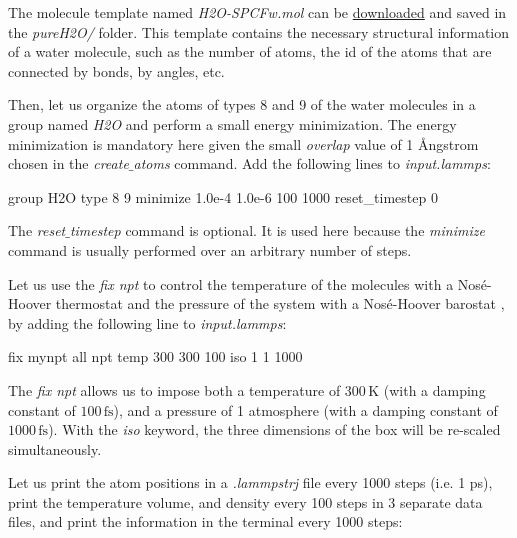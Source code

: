 \vspace{0.25cm} \noindent The molecule template named \textit{H2O-SPCFw.mol}
can be \href{https://lammpstutorials.github.io/lammpstutorials-inputs/level2/polymer-in-water/pureH2O/H2O-SPCFw.mol}{downloaded}
and saved in the \textit{pureH2O/} folder.
This template contains the necessary structural
information of a water molecule, such as the number of atoms, 
the id of the atoms that are connected by bonds, by angles, etc.

\vspace{0.25cm} \noindent Then, let us organize the atoms of types 8 and 9 of the water molecules
in a group named \textit{H2O} and perform a small energy minimization. The
energy minimization is mandatory here given the small \textit{overlap} value
of 1 Ångstrom chosen in the \textit{create$\_$atoms} command. Add the following lines
to \textit{input.lammps}:

\begin{lcverbatim}
group H2O type 8 9
minimize 1.0e-4 1.0e-6 100 1000
reset_timestep 0
\end{lcverbatim}

\noindent The \textit{reset$\_$timestep} command is optional. It is used here 
because the \textit{minimize} command is usually performed over an arbitrary
number of steps.

\vspace{0.25cm} \noindent Let us use the \textit{fix npt} to
control the temperature of the molecules with a Nosé-Hoover thermostat and
the pressure of the system with a Nosé-Hoover barostat 
\cite{nose1984unified, hoover1985canonical, martyna1994constant},
by adding the following line to \textit{input.lammps}:

\begin{lcverbatim}
fix mynpt all npt temp 300 300 100 iso 1 1 1000
\end{lcverbatim}

\noindent The \textit{fix npt} allows us to impose both a temperature of $300\,\text{K}$
(with a damping constant of $100\,\text{fs}$),
and a pressure of 1 atmosphere (with a damping constant of $1000\,\text{fs}$).
With the \textit{iso} keyword, the three dimensions of the box will be re-scaled
simultaneously.

\vspace{0.25cm} \noindent Let us print the atom positions in a \textit{.lammpstrj} file every 1000
steps (i.e. 1 ps), print the temperature volume, and
density every 100 steps in 3 separate data files, and
print the information in the terminal every 1000 steps:

